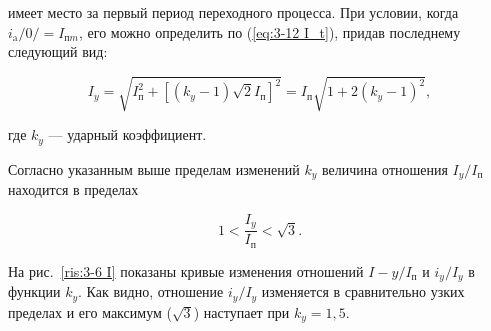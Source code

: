  имеет место за первый период  переходного процесса. При условии, когда $ i_{\text{a}}/0/ = I_{\text{п}m} $, его можно определить по (\ref{eq:3-12 I_t}), придав последнему следующий вид:

\begin{equation}
	I_y = \sqrt{I^2_{\text{п}} + [(k_y - 1) \sqrt{2} I_{\text{п}}]^2} = I_{\text{п}} \sqrt{1 + 2(k_y-1)^2},
	\label{eq:3-13 I_y}
\end{equation}

где $ k_y $ --- ударный коэффициент.

Согласно указанным выше пределам изменений $ k_y $ величина отношения $ I_y / I_{\text{п}} $ находится в пределах

\begin{equation*}
	1 < \frac{I_y}{I_{\text{п}}} < \sqrt{3}.
\end{equation*}

На рис.~\ref{ris:3-6 I} показаны кривые изменения отношений $ I-y / I_{\text{п}} $ и $ i_y / I_y $ в функции $ k_y $. Как видно, отношение $ i_y / I_y $ изменяется в сравнительно узких пределах и его максимум ($ \sqrt{3} $) наступает при $ k_y = 1,5 $.


